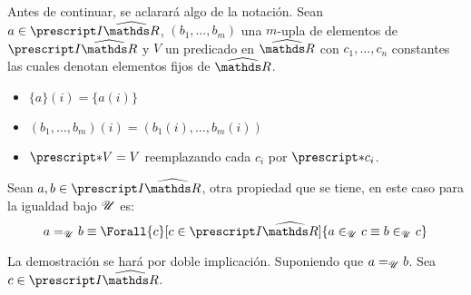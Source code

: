 Antes de continuar, se aclarará algo de la notación. Sean $a\in\IRh$,
$(b_1,\dots,b_m)$ una $m$-upla de elementos de $\IRh$ y $V$ un predicado
en $\Rh$ con $c_1,\dots,c_n$ constantes las cuales denotan elementos
fijos de $\Rh$.
\begin{itemize}
  \item $\{a\}(i) = \{a(i)\}$
  \item $(b_1,\dots,b_m)(i) = (b_1(i),\dots,b_m(i))$
  \item $\st{V} = V$ reemplazando cada $c_i$ por $\st{c_i}$.
\end{itemize}
Sean $a,b\in \IRh$, otra propiedad que se tiene, en este caso para
la igualdad bajo $\mathscr{U}$ es:
\[a \equ b \equiv \Forall{c}[c\in\IRh]{a\inu c \equiv b \inu c}\]
\begin{demo}
  La demostración se hará por doble implicación.
  Suponiendo que $a=_{\mathscr{U}} b$. Sea $c\in\IRh$.
  \begin{center}
  \end{center}


\end{demo}
